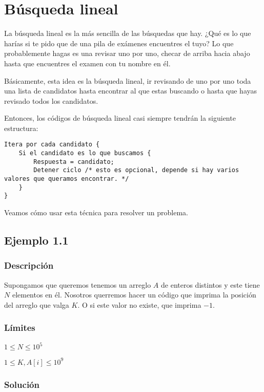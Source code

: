 \chapter* {Búsqueda lineal}
La búsqueda lineal es la más sencilla de las búsquedas que hay. ¿Qué es lo que harías si te pido que de una pila de exámenes encuentres el tuyo? Lo que probablemente hagas es una revisar uno por uno, checar de arriba hacia abajo hasta que encuentres el examen con tu nombre en él.

Básicamente, esta idea es la búsqueda lineal, ir revisando de uno por uno toda una lista de candidatos hasta encontrar al que estas buscando o hasta que hayas revisado todos los candidatos.

Entonces, los códigos de búsqueda lineal casi siempre tendrán la siguiente estructura:

\begin{lstlisting}
Itera por cada candidato {
	Si el candidato es lo que buscamos {
		Respuesta = candidato;
		Detener ciclo /* esto es opcional, depende si hay varios valores que queramos encontrar. */
	}
}	
\end{lstlisting}

Veamos cómo usar esta técnica para resolver un problema.

\section*{Ejemplo 1.1}

\subsection*{Descripción}
Supongamos que queremos tenemos un arreglo \(A\) de enteros distintos y este tiene \(N\) elementos en él. Nosotros querremos hacer un código que imprima la posición del arreglo que valga \(K\). O si este valor no existe, que imprima \(-1\).

\subsection*{Límites}
\begin{plimits}
	\item \(1\leq N \leq 10^5\)
	\item \(1\leq K,A[i] \leq 10^9\)
\end{plimits}
\subsection*{Solución}

